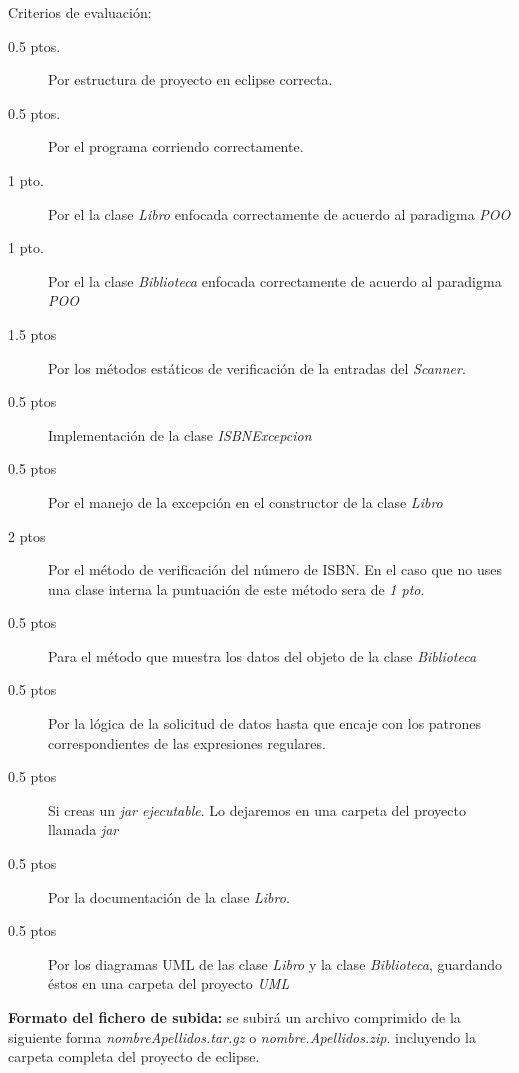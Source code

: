 \documentclass[addpoints,12pt]{exam}
\begin{document}
\begin{questions}
Criterios de evaluación:
\begin{description}
\item[0.5 ptos.] Por estructura de proyecto en eclipse correcta.
\item[0.5 ptos.] Por el programa corriendo correctamente.
\item[1 pto.] Por el la clase \emph{Libro} enfocada correctamente de acuerdo al paradigma \emph{POO}
\item[1 pto.] Por el la clase \emph{Biblioteca} enfocada correctamente de acuerdo al paradigma \emph{POO}
\item[1.5 ptos] Por los métodos estáticos de verificación de la entradas del \emph{Scanner}.
\item[0.5 ptos] Implementación de la clase \emph{ISBNExcepcion}
\item[0.5 ptos] Por el manejo de la excepción en el constructor de la clase \emph{Libro}
\item[2 ptos] Por el método de verificación del número de ISBN. En el caso que no uses una clase interna la puntuación de este método sera de \emph{1 pto}.
\item[0.5 ptos] Para el método que muestra los datos del objeto de la clase \emph{Biblioteca}
\item[0.5 ptos] Por la lógica de la solicitud de datos hasta que encaje con los patrones correspondientes de las expresiones regulares.
\item[0.5 ptos] Si creas un \emph{jar ejecutable}. Lo dejaremos en una carpeta del proyecto llamada \emph{jar}
\item[0.5 ptos] Por la documentación de la clase \emph{Libro}. 
\item[0.5 ptos] Por los diagramas UML de las clase \emph{Libro} y la clase \emph{Biblioteca}, guardando éstos en una carpeta del proyecto \emph{UML}
\end{description}
\textbf{Formato del fichero de subida:} se subirá un archivo comprimido de la siguiente forma \emph{nombreApellidos.tar.gz} o \emph{nombre.Apellidos.zip}. incluyendo la carpeta completa del proyecto de eclipse.
\end{questions}
\end{document}
